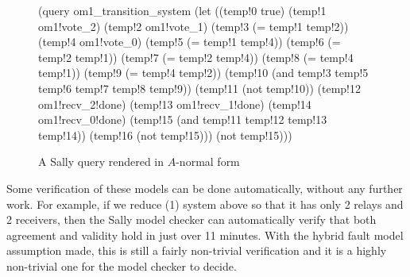 \begin{figure}
\begin{sally}
(query
 om1_transition_system
 (let
  ((temp!0 true)
   (temp!1 om1!vote_2)
   (temp!2 om1!vote_1)
   (temp!3 (= temp!1 temp!2))
   (temp!4 om1!vote_0)
   (temp!5 (= temp!1 temp!4))
   (temp!6 (= temp!2 temp!1))
   (temp!7 (= temp!2 temp!4))
   (temp!8 (= temp!4 temp!1))
   (temp!9 (= temp!4 temp!2))
   (temp!10 (and temp!3 temp!5 temp!6 temp!7 temp!8 temp!9))
   (temp!11 (not temp!10))
   (temp!12 om1!recv_2!done)
   (temp!13 om1!recv_1!done)
   (temp!14 om1!recv_0!done)
   (temp!15 (and temp!11 temp!12 temp!13 temp!14))
   (temp!16 (not temp!15)))
  (not temp!15)))
\end{sally}
\caption{A Sally query rendered in $A$-normal form}
\label{fig:sally-query}
\end{figure}

Some verification of these models can be done automatically, without any
further work. For example, if we reduce \OM(1) system above so that it has
only 2 relays and 2 receivers, then the Sally model checker can automatically
verify that both agreement and validity hold in just over 11 minutes. With the
hybrid fault model assumption made, this is still a fairly non-trivial
verification and it is a highly non-trivial one for the model checker to
decide.
